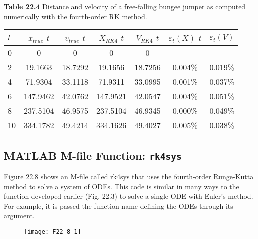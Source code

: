 \documentclass[../main.tex]{subfiles}
\begin{document}
\vspace{0,3in}
\textbf{Table 22.4} Distance and velocity of a free-falling bungee jumper as computed
numerically with the fourth-order RK method.
\\
\begin{tabular}{lcccccc}
\hline

	\textbf{$t$} \; \; \; \; \; & \textbf{$x_{true}$} 
	\textbf{$t$} \; \; \; \; \; & \textbf{$v_{true}$} 
	\textbf{$t$} \; \; \; \; \; & \textbf{$X_{RK4}$} 
	\textbf{$t$} \; \; \; \; \; & \textbf{$V_{RK4}$} 
	\textbf{$t$} \; \; \; \; \; & \textbf{$\varepsilon_{t}(X)$} 
	\textbf{$t$} \; \; \; \; \; & \textbf{$\varepsilon_{t}(V)$}\\
	
\hline

	0 & 0 & 0 & 0 & 0 & \vspace{0in} & \vspace{0in}\\

	2 & 19.1663 & 18.7292 & 19.1656 & 18.7256 & 0.004\% & 0.019\%\\

	4 & 71.9304 & 33.1118 & 71.9311 & 33.0995 & 0.001\% & 0.037\%\\

	6 & 147.9462 & 42.0762 & 147.9521 & 42.0547 & 0.004\% & 0.051\%\\

	8 & 237.5104 & 46.9575 & 237.5104 & 46.9345 & 0.000\% & 0.049\%\\

	10 & 334.1782 & 49.4214 & 334.1626 & 49.4027 & 0.005\% & 0.038\%\\


\hline
\end{tabular}

\subsection{MATLAB M-file Function: \texttt{rk4sys}}
\vspace{0.1 in}
Figure 22.8 shows an M-file called rk4sys that uses the fourth-order Runge-Kutta method
to solve a system of ODEs. This code is similar in many ways to the function developed
earlier (Fig. 22.3) to solve a single ODE with Euler's method. For example, it is passed the
function name defining the ODEs through its argument.

\begin{figure}[hbt!]
	\texttt{[image: F22\_8\_1]}
	\label{F22.8.1}
\end{figure}
\end{document}
